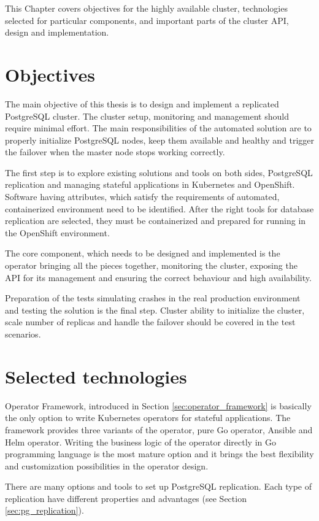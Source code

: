 \documentclass[
  digital, %
  twoside, %
  table,   %
  lof,     %
  lot,     %
]{fithesis3}
\begin{document}
This Chapter covers objectives for the highly available cluster, technologies selected for particular components, and important parts of the cluster API, design and implementation.

\section{Objectives}
The main objective of this thesis is to design and implement a replicated PostgreSQL cluster. The cluster setup, monitoring and management should require minimal effort. The main responsibilities of the automated solution are to properly initialize PostgreSQL nodes, keep them available and healthy and trigger the failover when the master node stops working correctly.

The first step is to explore existing solutions and tools on both sides, PostgreSQL replication and managing stateful applications in Kubernetes and OpenShift. Software having attributes, which satisfy the requirements of automated, containerized environment need to be identified. After the right tools for database replication are selected, they must be containerized and prepared for running in the OpenShift environment.

The core component, which needs to be designed and implemented is the operator bringing all the pieces together, monitoring the cluster, exposing the API for its management and ensuring the correct behaviour and high availability.

Preparation of the tests simulating crashes in the real production environment and testing the solution is the final step. Cluster ability to initialize the cluster, scale number of replicas and handle the failover should be covered in the test scenarios.

\section{Selected technologies} \label{sec:selected_technologies}
Operator Framework, introduced in Section \ref{sec:operator_framework} is basically the only option to write Kubernetes operators for stateful applications. The framework provides three variants of the operator, pure Go operator, Ansible and Helm operator. Writing the business logic of the operator directly in Go programming language is the most mature option and it brings the best flexibility and customization possibilities in the operator design.

There are many options and tools to set up PostgreSQL replication. Each type of replication have different properties and advantages (see Section \ref{sec:pg_replication}).
\end{document}
